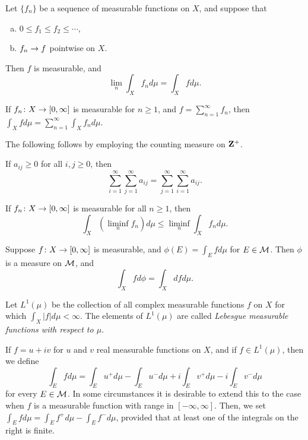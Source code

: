 \begin{theorem}
  Let $\{f_n\}$ be a sequence of measurable functions on $X$, and suppose that
  \begin{enumerate}[(a)]
  \item $0 \leq f_1 \leq f_2 \leq \cdots$,
  \item $f_n \rightarrow f$ pointwise on $X$.
  \end{enumerate}
  Then $f$ is measurable, and
  \[
  \lim_n \int_X f_n d\mu = \int_X f d\mu.
  \]
\end{theorem}

\begin{theorem}
  If $f_n \colon X \rightarrow [0,\infty]$ is measurable for $n \geq 1$, and $f = \sum_{n=1}^\infty f_n$, then $\int_X f d\mu = \sum_{n=1}^\infty \int_X f_n d\mu$.
\end{theorem}

The following follows by employing the counting measure on $\mathbf{Z}^+$.

\begin{corollary}
  If $a_{i j} \geq 0$ for all $i,j \geq 0$, then
  \[
  \sum_{i=1}^\infty \sum_{j=1}^\infty a_{i j} = \sum_{j=1}^\infty \sum_{i=1}^\infty a_{i j}.
  \]
\end{corollary}

\begin{proposition}
  If $f_n \colon X \rightarrow [0,\infty]$ is measurable for all $n \geq 1$, then
  \[
  \int_X \left( \liminf_n f_n \right) d\mu \leq \liminf_n \int_X f_n d\mu.
  \]
\end{proposition}

\begin{theorem}
  Suppose $f \colon X \rightarrow [0,\infty]$ is measurable, and $\phi(E) = \int_E f d\mu$ for $E \in \mathcal{M}$. Then $\phi$ is a measure on $\mathcal{M}$, and
  \[
  \int_X f d\phi = \int_X d f d\mu.
  \]
\end{theorem}

\begin{definition}
  Let $L^1(\mu)$ be the collection of all complex measurable functions $f$ on $X$ for which $\int_X |f| d\mu < \infty$. The elements of $L^1(\mu)$ are called \emph{Lebesgue measurable functions with respect to $\mu$}.
\end{definition}

\begin{definition}
  If $f = u + i v$ for $u$ and $v$ real measurable functions on $X$, and if $f \in L^1(\mu)$, then we define
  \[
  \int_E f d\mu = \int_E u^+ d\mu - \int_E u^- d\mu + i \int_E v^+ d\mu - i \int_E v^- d\mu
  \]
  for every $E \in \mathcal{M}$. In some circumstances it is desirable to extend this to the case when $f$ is a measurable function with range in $[-\infty,\infty]$. Then, we set $\int_E f d\mu = \int_E f^+ d\mu - \int_E f^- d\mu$, provided that at least one of the integrals on the right is finite.
\end{definition}

